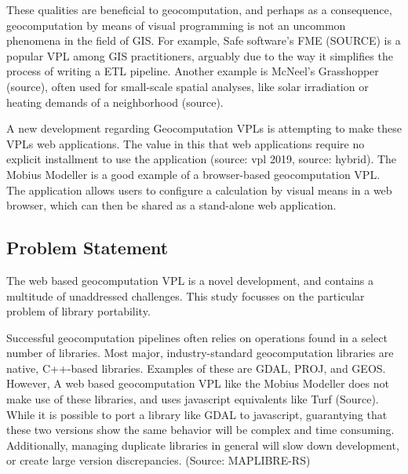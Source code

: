 These qualities are beneficial to geocomputation, and perhaps as a consequence, geocomputation by means of visual programming is not an uncommon phenomena in the field of \ac{GIS}.
For example, Safe software's FME (SOURCE) is a popular \ac{VPL} among \ac{GIS} practitioners, arguably due to the way it simplifies the process of writing a \ac{ETL} pipeline. 
Another example is McNeel's Grasshopper (source), often used for small-scale spatial analyses, like solar irradiation or heating demands of a neighborhood (source). 

A new development regarding Geocomputation VPLs is attempting to make these VPLs web applications.
The value in this that web applications require no explicit installment to use the application (source: vpl 2019, source: hybrid). 
The Mobius Modeller is a good example of a browser-based geocomputation VPL.
The application allows users to configure a calculation by visual means in a web browser, which can then be shared as a stand-alone web application. 




\subsection*{Problem Statement}
  
The web based geocomputation VPL is a novel development, and contains a multitude of unaddressed challenges.
This study focusses on the particular problem of library portability. %

Successful geocomputation pipelines often relies on operations found in a select number of libraries. 
Most major, industry-standard geocomputation libraries are native, C++-based libraries. 
Examples of these are GDAL, PROJ, and GEOS. 
However, A web based geocomputation VPL like the Mobius Modeller does not make use of these libraries, and uses javascript equivalents like Turf (Source).
While it is possible to port a library like GDAL to javascript, guarantying that these two versions show the same behavior will be complex and time consuming. Additionally, managing duplicate libraries in general will slow down development, or create large version discrepancies. (Source: MAPLIBRE-RS) 

